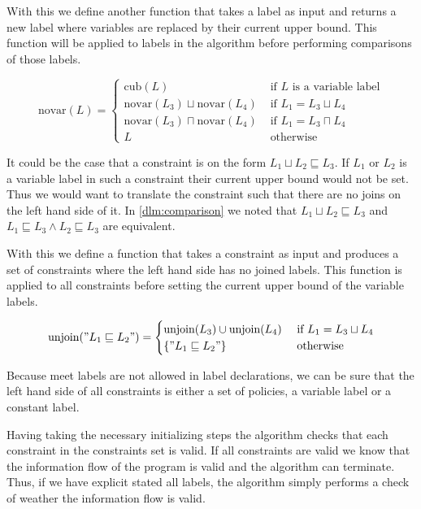 With this we define another function that takes a label as input and returns a new label where variables are replaced by their current upper bound.
This function will be applied to labels in the algorithm before performing comparisons of those labels.

\[
\text{novar}(L) =
\begin{cases}
  \text{cub}(L) & \text{ if } L \text{ is a variable label}\\
  \text{novar}(L_3) \sqcup \text{novar}(L_4) & \text{ if } L_1 = L_3 \sqcup L_4\\
  \text{novar}(L_3) \sqcap \text{novar}(L_4) & \text{ if } L_1 = L_3 \sqcap L_4\\
  L & \text{ otherwise}
\end{cases}
\]

It could be the case that a constraint is on the form $L_1 \sqcup L_2 \sqsubseteq L_3$.
If $L_1$ or $L_2$ is a variable label in such a constraint their current upper bound would not be set.
Thus we would want to translate the constraint such that there are no joins on the left hand side of it.
In \cref{dlm:comparison} we noted that $L_1 \sqcup L_2 \sqsubseteq L_3$ and $L_1 \sqsubseteq L_3 \wedge L_2 \sqsubseteq L_3$ are equivalent.

With this we define a function that takes a constraint as input and produces a set of constraints where the left hand side has no joined labels.
This function is applied to all constraints before setting the current upper bound of the variable labels.

\[
\text{unjoin}("L_1 \sqsubseteq L_2") =
\begin{cases}
  \text{unjoin}(L_3) \cup \text{unjoin}(L_4) & \text{ if } L_1 = L_3 \sqcup L_4\\
  \{"L_1 \sqsubseteq L_2"\} & \text{ otherwise}
\end{cases}
\]

Because meet labels are not allowed in label declarations, we can be sure that the left hand side of all constraints is either a set of policies, a variable label or a constant label.

Having taking the necessary initializing steps the algorithm checks that each constraint in the constraints set is valid.
If all constraints are valid we know that the information flow of the program is valid and the algorithm can terminate.
Thus, if we have explicit stated all labels, the algorithm simply performs a check of weather the information flow is valid.

